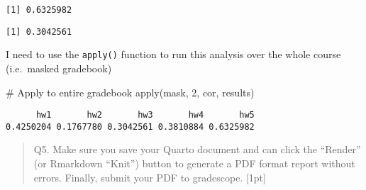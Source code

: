 \documentclass[
  letterpaper,
  DIV=11,
  numbers=noendperiod]{scrartcl}
\newenvironment{Shaded}{\begin{snugshade}}{\end{snugshade}}
\newcommand{\CommentTok}[1]{\textcolor[rgb]{0.37,0.37,0.37}{#1}}
\newcommand{\DecValTok}[1]{\textcolor[rgb]{0.68,0.00,0.00}{#1}}
\newcommand{\FunctionTok}[1]{\textcolor[rgb]{0.28,0.35,0.67}{#1}}
\newcommand{\NormalTok}[1]{\textcolor[rgb]{0.00,0.23,0.31}{#1}}
\newcommand{\SpecialCharTok}[1]{\textcolor[rgb]{0.37,0.37,0.37}{#1}}
\begin{document}
\begin{verbatim}
[1] 0.6325982
\end{verbatim}

\begin{Shaded}
\end{Shaded}

\begin{verbatim}
[1] 0.3042561
\end{verbatim}

I need to use the \texttt{apply()} function to run this analysis over
the whole course (i.e.~masked gradebook)

\begin{Shaded}
\begin{Highlighting}[]
\CommentTok{\# Apply to entire gradebook}
\FunctionTok{apply}\NormalTok{(mask, }\DecValTok{2}\NormalTok{, cor, results)}
\end{Highlighting}
\end{Shaded}

\begin{verbatim}
      hw1       hw2       hw3       hw4       hw5 
0.4250204 0.1767780 0.3042561 0.3810884 0.6325982 
\end{verbatim}

\begin{quote}
Q5. Make sure you save your Quarto document and can click the ``Render''
(or Rmarkdown ``Knit'') button to generate a PDF format report without
errors. Finally, submit your PDF to gradescope. {[}1pt{]}
\end{quote}
\end{document}
